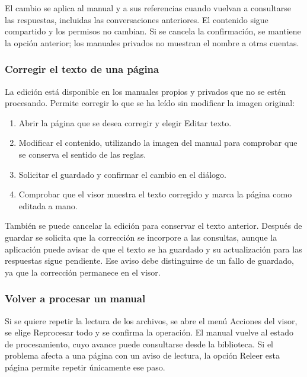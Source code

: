 El cambio se aplica al manual y a sus referencias cuando vuelvan a
consultarse las respuestas, incluidas las conversaciones anteriores.
El contenido sigue compartido y los permisos no cambian. Si se cancela
la confirmación, se mantiene la opción anterior; los manuales privados
no muestran el nombre a otras cuentas.

\subsubsection{Corregir el texto de una página}
\label{sec:e-editar-texto}

La edición está disponible en los manuales propios y privados que no se
estén procesando. Permite corregir lo que se ha leído sin modificar la
imagen original:

\begin{enumerate}
    \item Abrir la página que se desea corregir y elegir
    \guillemotleft{}Editar texto\guillemotright{}.
    \item Modificar el contenido, utilizando la imagen del manual para
    comprobar que se conserva el sentido de las reglas.
    \item Solicitar el guardado y confirmar el cambio en el diálogo.
    \item Comprobar que el visor muestra el texto corregido y marca la
    página como editada a mano.
\end{enumerate}

También se puede cancelar la edición para conservar el texto anterior.
Después de guardar se solicita que la corrección se incorpore a las
consultas, aunque la aplicación puede avisar de que el texto se ha guardado
y su actualización para las respuestas sigue pendiente. Ese aviso debe
distinguirse de un fallo de guardado, ya que la corrección permanece en el
visor.

\subsubsection{Volver a procesar un manual}
\label{sec:e-reprocesar}

Si se quiere repetir la lectura de los archivos, se abre el menú
\guillemotleft{}Acciones\guillemotright{} del visor, se elige
\guillemotleft{}Reprocesar todo\guillemotright{} y se confirma la operación.
El manual vuelve al estado de procesamiento, cuyo avance puede consultarse
desde la biblioteca. Si el problema afecta a una página con un aviso de
lectura, la opción \guillemotleft{}Releer esta página\guillemotright{}
permite repetir únicamente ese paso.

